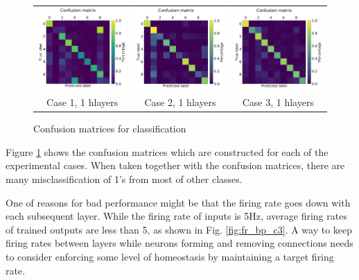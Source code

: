 \documentclass{article}
\begin{document}
\begin{figure}[tbh]
    \centering
    \begin{centering}
    \begin{tabular}{ccc}
        \includegraphics[width=0.30\linewidth, trim=0cm 0cm 0cm 1.5cm, clip=true]{mnist_confusion_matrix_rate_based_case_1_rate_pynn8_1dlayers_3x_20200217}&
        \includegraphics[width=0.30\linewidth, trim=0cm 0cm 0cm 1.5cm, clip=true]{mnist_confusion_matrix_rate_based_case_2_rate_pynn8_1dlayers_3x_20200217}&
        \includegraphics[width=0.30\linewidth, trim=0cm 0cm 0cm 1.5cm, clip=true]{mnist_confusion_matrix_rate_based_case_3_rate_pynn8_1dlayers_2x_20200217}\\
        Case 1, 1 hlayers & Case 2, 1 hlayers & Case 3, 1 hlayers
        \end{tabular}
     \end{centering}
     \caption{Confusion matrices for classification}
     \label{fig:confmat}
    \vspace{-10pt}
\end{figure}

Figure \ref{fig:confmat} shows the confusion matrices which are constructed for each of the experimental cases.
When taken together with the confusion matrices, there are many misclassification of 1's from most of other classes.


One of reasons for bad performance might be that the firing rate goes down with each subsequent layer. While the firing rate of inputs is 5Hz, average firing rates of trained outputs are less than 5, as shown in Fig. \ref{fig:fr_bp_c3}. A way to keep firing rates between layers while neurons forming and removing connections needs to consider enforcing some level of  homeostasis by maintaining a target firing rate.
\end{document}
